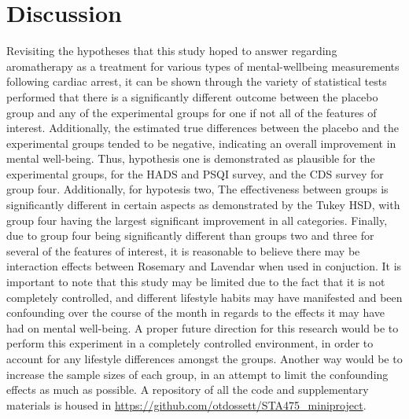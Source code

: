 \documentclass{article}
\begin{document}
\section{Discussion}
Revisiting the hypotheses that this study hoped to answer regarding aromatherapy
as a treatment for various types of mental-wellbeing measurements following
cardiac arrest, it can be
shown through the variety of statistical tests performed that there is a
significantly different outcome between the placebo group and any of the
experimental groups for one if not all of the features of interest. Additionally,
the estimated true differences between the placebo and the experimental groups
tended to be negative, indicating an overall improvement in mental well-being.
Thus, hypothesis one is demonstrated as plausible for the experimental groups,
for the HADS and PSQI survey, and the CDS survey for group four.  Additionally,
for hypotesis two, The effectiveness between groups is significantly different
in certain aspects as demonstrated by the Tukey HSD, with group four having
the largest significant improvement in all categories.  Finally, due to
group four being significantly different than groups two and three for
several of the features of interest, it is reasonable to believe there may
be interaction effects between Rosemary and Lavendar when used in conjuction.
It is important to note that this study may be limited due to the fact that
it is not completely controlled, and different lifestyle habits may have manifested
and been confounding over the course of the month in regards to the effects it
may have had on mental well-being. A proper future direction for this research
would be to perform this experiment in a completely controlled environment,
in order to account for any lifestyle differences amongst the groups.  Another
way would be to increase the sample sizes of each group, in an attempt to
limit the confounding effects as much as possible.
\hfill \break \hfill \break
A repository of all the code and supplementary materials is housed in
\url{https://github.com/otdossett/STA475_miniproject}.
\end{document}

